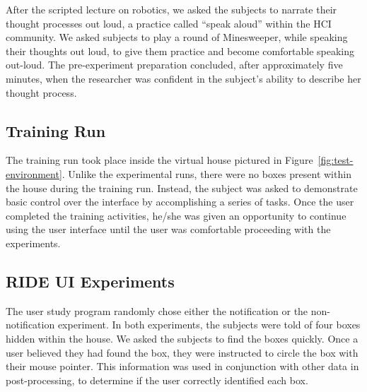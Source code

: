 After the scripted lecture on robotics, we asked the subjects to narrate their thought processes out loud, a practice called “speak aloud” within the HCI community. We asked subjects to play a round of Minesweeper, while speaking their thoughts out loud, to give them practice and become comfortable speaking out-loud. The pre-experiment preparation concluded, after approximately five minutes, when the researcher was confident in the subject’s ability to describe her thought process.


\subsection{Training Run} %
\label{sub:training_run}
The training run took place inside the virtual house pictured in Figure~\ref{fig:test-environment}. Unlike the experimental runs, there were no boxes present within the house during the training run. Instead, the subject was asked to demonstrate basic control over the interface by accomplishing a series of tasks. Once the user completed the training activities, he/she was given an opportunity to continue using the user interface until the user was comfortable proceeding with the experiments.


\subsection{RIDE UI Experiments} %
\label{sub:ride_ui_experiments}
The user study program randomly chose either the notification or the non-notification experiment. In both experiments, the subjects were told of four boxes hidden within the house. We asked the subjects to find the boxes quickly. Once a user believed they had found the box, they were instructed to circle the box with their mouse pointer. This information was used in conjunction with other data in post-processing, to determine if the user correctly identified each box.


